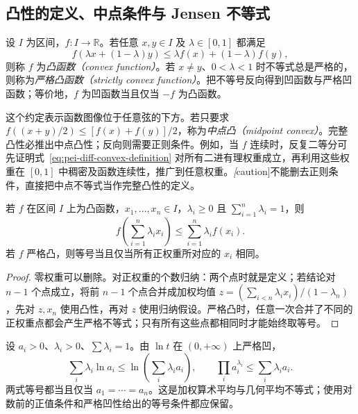 \subsection{凸性的定义、中点条件与 Jensen 不等式}

\begin{definition}
\label{def:pei-diff-convex}
设 $I$ 为区间，$f:I\to\mathbb R$。若任意 $x,y\in I$ 及 $\lambda\in[0,1]$ 都满足
\begin{equation}
 f(\lambda x+(1-\lambda)y)
 \le\lambda f(x)+(1-\lambda)f(y),
 \label{eq:pei-diff-convex-definition}
\end{equation}
则称 $f$ 为\emph{凸函数（convex function）}。若 $x\ne y$、$0<\lambda<1$ 时不等式总是严格的，则称为\emph{严格凸函数（strictly convex function）}。把不等号反向得到凹函数与严格凹函数；等价地，$f$ 为凹函数当且仅当 $-f$ 为凸函数。
\end{definition}

这个约定表示函数图像位于任意弦的下方。若只要求
$f((x+y)/2)\le[f(x)+f(y)]/2$，称为\emph{中点凸（midpoint convex）}。完整凸性必推出中点凸性；反向则需要正则条件。例如，当 $f$ 连续时，反复二等分可先证明式~\eqref{eq:pei-diff-convex-definition} 对所有二进有理权重成立，再利用这些权重在 $[0,1]$ 中稠密及函数连续性，推广到任意权重。\emph[caution]{不能删去正则条件，直接把中点不等式当作完整凸性的定义}。

\begin{theorem}
\label{thm:pei-diff-jensen}
若 $f$ 在区间 $I$ 上为凸函数，$x_1,\ldots,x_n\in I$，$\lambda_i\ge0$ 且 $\sum_{i=1}^n\lambda_i=1$，则
\begin{equation}
 f\left(\sum_{i=1}^n\lambda_i x_i\right)
 \le\sum_{i=1}^n\lambda_i f(x_i).
 \label{eq:pei-diff-jensen}
\end{equation}
若 $f$ 严格凸，则等号当且仅当所有正权重所对应的 $x_i$ 相同。
\end{theorem}
\begin{proof}
零权重可以删除。对正权重的个数归纳：两个点时就是定义；若结论对 $n-1$ 个点成立，将前 $n-1$ 个点合并成加权均值
$z=(\sum_{i<n}\lambda_i x_i)/(1-\lambda_n)$，先对 $z,x_n$ 使用凸性，再对 $z$ 使用归纳假设。严格凸时，任意一次合并了不同的正权重点都会产生严格不等式；只有所有这些点都相同时才能始终取等号。
\end{proof}

\begin{example}
\label{ex:pei-diff-weighted-amgm}
设 $a_i>0$、$\lambda_i>0$、$\sum\lambda_i=1$。由 $\ln t$ 在 $(0,+\infty)$ 上严格凹，
\[
 \sum_i\lambda_i\ln a_i\le\ln\left(\sum_i\lambda_i a_i\right),
 \qquad
 \prod_i a_i^{\lambda_i}\le\sum_i\lambda_i a_i.
\]
两式等号都当且仅当 $a_1=\cdots=a_n$。这是加权算术平均与几何平均不等式；使用对数前的正值条件和严格凹性给出的等号条件都应保留。
\end{example}

